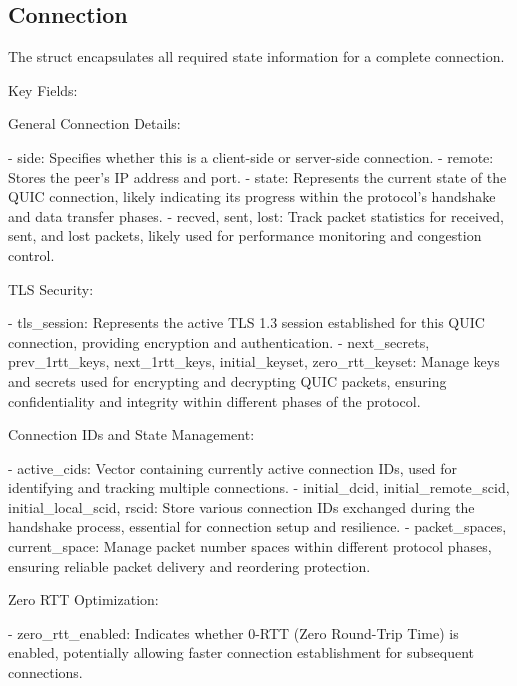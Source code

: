 \subsection{Connection}

The  struct encapsulates all required state information for a complete connection. 

Key Fields:

General Connection Details:

- side: Specifies whether this is a client-side or server-side connection.
- remote: Stores the peer's IP address and port.
- state: Represents the current state of the QUIC connection, likely indicating its progress within the protocol's handshake and data transfer phases.
- recved, sent, lost: Track packet statistics for received, sent, and lost packets, likely used for performance monitoring and congestion control.

TLS Security:

- tls\_session: Represents the active TLS 1.3 session established for this QUIC connection, providing encryption and authentication.
- next\_secrets, prev\_1rtt\_keys, next\_1rtt\_keys, initial\_keyset, zero\_rtt\_keyset: Manage keys and secrets used for encrypting and decrypting QUIC packets, ensuring confidentiality and integrity within different phases of the protocol.

Connection IDs and State Management:

- active\_cids: Vector containing currently active connection IDs, used for identifying and tracking multiple connections.
- initial\_dcid, initial\_remote\_scid, initial\_local\_scid, rscid: Store various connection IDs exchanged during the handshake process, essential for connection setup and resilience.
- packet\_spaces, current\_space: Manage packet number spaces within different protocol phases, ensuring reliable packet delivery and reordering protection.

Zero RTT Optimization:

- zero\_rtt\_enabled: Indicates whether 0-RTT (Zero Round-Trip Time) is enabled, potentially allowing faster connection establishment for subsequent connections.

